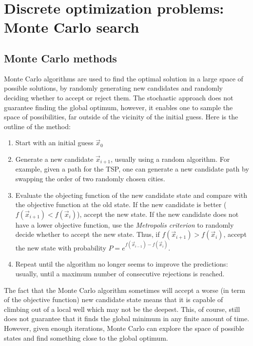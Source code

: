 \documentclass[
  letterpaper,
  DIV=11,
  numbers=noendperiod]{scrreprt}
\begin{document}

\chapter{Discrete optimization problems: Monte Carlo
search}\label{discrete-optimization-problems-monte-carlo-search}

\section{Monte Carlo methods}\label{monte-carlo-methods}

Monte Carlo algorithms are used to find the optimal solution in a large
space of possible solutions, by randomly generating new candidates and
randomly deciding whether to accept or reject them. The stochastic
approach does not guarantee finding the global optimum, however, it
enables one to sample the space of possibilities, far outside of the
vicinity of the initial guess. Here is the outline of the method:

\begin{enumerate}
\def\labelenumi{\arabic{enumi}.}
\item
  Start with an initial guess \(\vec x_0\)
\item
  Generate a new candidate \(\vec x_{i+1}\), usually using a random
  algorithm. For example, given a path for the TSP, one can generate a
  new candidate path by swapping the order of two randomly chosen
  cities.
\item
  Evaluate the objecting function of the new candidate state and compare
  with the objective function at the old state. If the new candidate is
  better (\(f(\vec x_{i+1}) < f(\vec x_i)\)), accept the new state. If
  the new candidate does not have a lower objective function, use the
  \emph{Metropolis criterion} to randomly decide whether to accept the
  new state. Thus, if \(f(\vec x_{i+1}) > f(\vec x_i)\), accept the new
  state with probability \(P = e^{f(\vec x_{i-1}) - f(\vec x_i)}\).
\item
  Repeat until the algorithm no longer seems to improve the predictions:
  usually, until a maximum number of consecutive rejections is reached.
\end{enumerate}

The fact that the Monte Carlo algorithm sometimes will accept a worse
(in term of the objective function) new candidate state means that it is
capable of climbing out of a local well which may not be the deepest.
This, of course, still does not guarantee that it finds the global
minimum in any finite amount of time. However, given enough iterations,
Monte Carlo can explore the space of possible states and find something
close to the global optimum.
\end{document}
